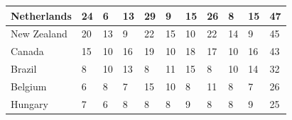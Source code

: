\documentclass[12pt]{article}  %
\begin{document}
\begin{subappendices}
\begin{longtable}{|l|l|l|l|l|l|l|l|l|l|l|}
	\hline
	Netherlands                                                    & 24                                                & 6                                                 & 13                                                & 29                                                & 9                                                 & 15                                                & 26   & 8      & 15     & 47     \\ 
	\hline
	New Zealand                                                    & 20                                                & 13                                                & 9                                                 & 22                                                & 15                                                & 10                                                & 22   & 14     & 9      & 45     \\ 
	\hline
	Canada                                                         & 15                                                & 10                                                & 16                                                & 19                                                & 10                                                & 18                                                & 17   & 10     & 16     & 43     \\ 
	\hline
	Brazil                                                         & 8                                                 & 10                                                & 13                                                & 8                                                 & 11                                                & 15                                                & 8    & 10     & 14     & 32     \\ 
	\hline
	Belgium                                                        & 6                                                 & 8                                                 & 7                                                 & 15                                                & 10                                                & 8                                                 & 11   & 8      & 7      & 26     \\ 
	\hline
	Hungary                                                        & 7                                                 & 6                                                 & 8                                                 & 8                                                 & 8                                                 & 9                                                 & 8    & 8      & 9      & 25     \\ 

\end{longtable}
\end{subappendices}
\end{document}

